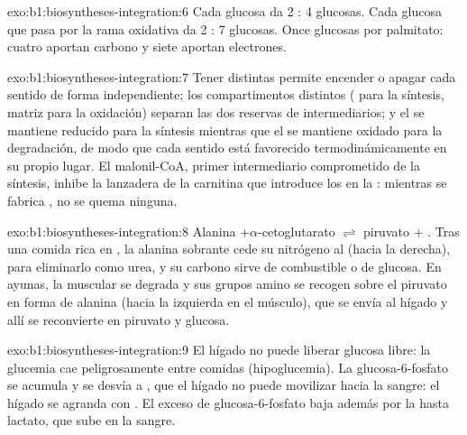 \begin{solution}{exo:b1:biosyntheses-integration:6}
Cada glucosa da 2 : 4 glucosas. Cada glucosa que pasa por la rama
oxidativa da 2 : 7 glucosas. Once glucosas por palmitato: cuatro
aportan carbono y siete aportan electrones.
\end{solution}

\begin{solution}{exo:b1:biosyntheses-integration:7}
Tener  distintas permite encender o apagar cada sentido de forma
independiente; los compartimentos distintos ( para la síntesis,
matriz para la oxidación) separan las dos reservas de intermediarios; y el
 se mantiene reducido para la síntesis mientras que el  se mantiene
oxidado para la degradación, de modo que cada sentido está favorecido
termodinámicamente en su propio lugar. El malonil-CoA, primer intermediario
comprometido de la síntesis, inhibe la lanzadera de la carnitina que
introduce los  en la : mientras se fabrica , no
se quema ninguna.
\end{solution}

\begin{solution}{exo:b1:biosyntheses-integration:8}
Alanina $+ \alpha$-cetoglutarato $\rightleftharpoons$ piruvato $+$
. Tras una comida rica en , la alanina sobrante cede su
nitrógeno al  (hacia la derecha), para eliminarlo como urea, y su
carbono sirve de combustible o de glucosa. En ayunas, la  muscular
se degrada y sus grupos amino se recogen sobre el piruvato en forma de
alanina (hacia la izquierda en el músculo), que se envía al hígado y allí se
reconvierte en piruvato y glucosa.
\end{solution}

\begin{solution}{exo:b1:biosyntheses-integration:9}
El hígado no puede liberar glucosa libre: la glucemia cae peligrosamente
entre comidas (hipoglucemia). La glucosa-6-fosfato se acumula y se desvía a
, que el hígado no puede movilizar hacia la sangre: el hígado se
agranda con . El exceso de glucosa-6-fosfato baja además por la
 hasta lactato, que sube en la sangre.
\end{solution}

